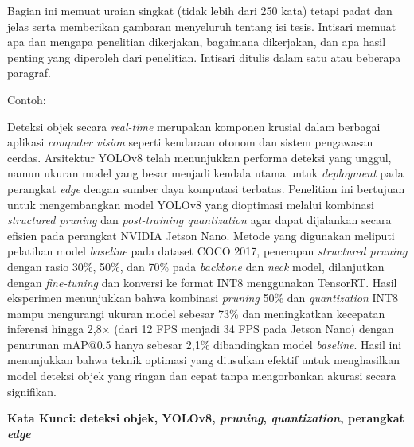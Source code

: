 Bagian ini memuat uraian singkat (tidak lebih dari 250 kata) tetapi padat dan jelas serta memberikan gambaran menyeluruh tentang isi tesis. Intisari memuat apa dan mengapa penelitian dikerjakan, bagaimana dikerjakan, dan apa hasil penting yang diperoleh dari penelitian. Intisari ditulis dalam satu atau beberapa paragraf.

Contoh:

Deteksi objek secara \textit{real-time} merupakan komponen krusial dalam berbagai aplikasi \textit{computer vision} seperti kendaraan otonom dan sistem pengawasan cerdas. Arsitektur YOLOv8 telah menunjukkan performa deteksi yang unggul, namun ukuran model yang besar menjadi kendala utama untuk \textit{deployment} pada perangkat \textit{edge} dengan sumber daya komputasi terbatas. Penelitian ini bertujuan untuk mengembangkan model YOLOv8 yang dioptimasi melalui kombinasi \textit{structured pruning} dan \textit{post-training quantization} agar dapat dijalankan secara efisien pada perangkat NVIDIA Jetson Nano. Metode yang digunakan meliputi pelatihan model \textit{baseline} pada dataset COCO 2017, penerapan \textit{structured pruning} dengan rasio 30\%, 50\%, dan 70\% pada \textit{backbone} dan \textit{neck} model, dilanjutkan dengan \textit{fine-tuning} dan konversi ke format INT8 menggunakan TensorRT. Hasil eksperimen menunjukkan bahwa kombinasi \textit{pruning} 50\% dan \textit{quantization} INT8 mampu mengurangi ukuran model sebesar 73\% dan meningkatkan kecepatan inferensi hingga 2,8$\times$ (dari 12 FPS menjadi 34 FPS pada Jetson Nano) dengan penurunan mAP@0.5 hanya sebesar 2,1\% dibandingkan model \textit{baseline}. Hasil ini menunjukkan bahwa teknik optimasi yang diusulkan efektif untuk menghasilkan model deteksi objek yang ringan dan cepat tanpa mengorbankan akurasi secara signifikan.

\vspace{2ex}
\noindent \textbf{Kata Kunci: deteksi objek, YOLOv8, \textit{pruning}, \textit{quantization}, perangkat \textit{edge}}
